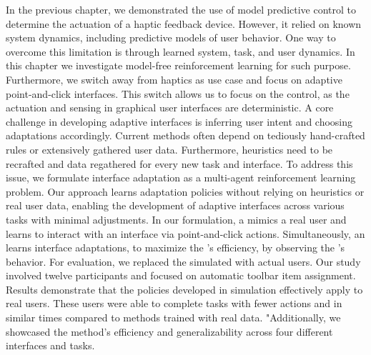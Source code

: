 In the previous chapter, we demonstrated the use of model predictive control to determine the actuation of a haptic feedback device. However, it relied on known system dynamics, including predictive models of user behavior. One way to overcome this limitation is through learned system, task, and user dynamics. In this chapter we investigate model-free reinforcement learning for such purpose. Furthermore, we switch away from haptics as use case and focus on adaptive point-and-click interfaces. This switch allows us to focus on the control, as the actuation and sensing in graphical user interfaces are deterministic.
%
A core challenge in developing adaptive interfaces is inferring user intent and choosing adaptations accordingly. Current methods often depend on tediously hand-crafted rules or extensively gathered user data. Furthermore, heuristics need to be recrafted and data regathered for every new task and interface.
%
To address this issue, we formulate interface adaptation as a multi-agent reinforcement learning problem. Our approach learns adaptation policies without relying on heuristics or real user data, enabling the development of adaptive interfaces across various tasks with minimal adjustments.
%
In our formulation, a \useragent mimics a real user and learns to interact with an interface via point-and-click actions.  Simultaneously, an \interfaceagent learns interface adaptations, to maximize the \useragent's efficiency, by observing the \useragent's behavior. 
%
For evaluation, we replaced the simulated \useragent with actual users. Our study involved twelve participants and focused on automatic toolbar item assignment. Results demonstrate that the policies developed in simulation effectively apply to real users. These users were able to complete tasks with fewer actions and in similar times compared to methods trained with real data. "Additionally, we showcased the method's efficiency and generalizability across four different interfaces and tasks.